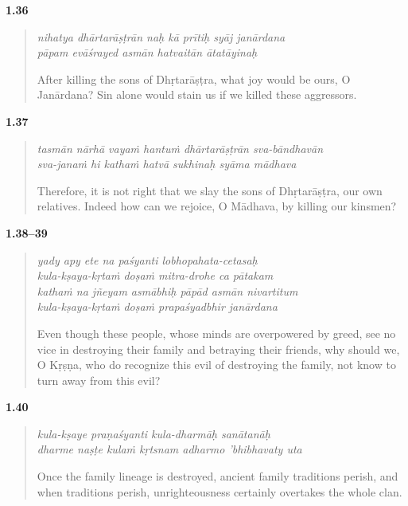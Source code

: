 \par\noindent\textbf{1.36}\par
\begin{verse}
\textit{nihatya dhārtarāṣṭrān naḥ kā prītiḥ syāj janārdana} \\
\textit{pāpam evāśrayed asmān hatvaitān ātatāyinaḥ}

\noindent After killing the sons of Dhṛtarāṣṭra, what joy would be ours, O Janārdana? Sin alone would stain us if we killed these aggressors.
\end{verse}
\par



\par\noindent\textbf{1.37}\par
\begin{verse}
\textit{tasmān nārhā vayaṁ hantuṁ dhārtarāṣṭrān sva-bāndhavān} \\
\textit{sva-janaṁ hi kathaṁ hatvā sukhinaḥ syāma mādhava}

\noindent Therefore, it is not right that we slay the sons of Dhṛtarāṣṭra, our own relatives. Indeed how can we rejoice, O Mādhava, by killing our kinsmen?
\end{verse}
\par



\par\noindent\textbf{1.38–39}\par
\begin{verse}
\textit{yady apy ete na paśyanti lobhopahata-cetasaḥ} \\
\textit{kula-kṣaya-kṛtaṁ doṣaṁ mitra-drohe ca pātakam} \\
\textit{kathaṁ na jñeyam asmābhiḥ pāpād asmān nivartitum} \\
\textit{kula-kṣaya-kṛtaṁ doṣaṁ prapaśyadbhir janārdana}

\noindent Even though these people, whose minds are overpowered by greed, see no vice in destroying their family and betraying their friends, why should we, O Kṛṣṇa, who do recognize this evil of destroying the family, not know to turn away from this evil?
\end{verse}
\par



\par\noindent\textbf{1.40}\par
\begin{verse}
\textit{kula-kṣaye praṇaśyanti kula-dharmāḥ sanātanāḥ} \\
\textit{dharme naṣṭe kulaṁ kṛtsnam adharmo ’bhibhavaty uta}

\noindent Once the family lineage is destroyed, ancient family traditions perish, and when traditions perish, unrighteousness certainly overtakes the whole clan.
\end{verse}
\par



